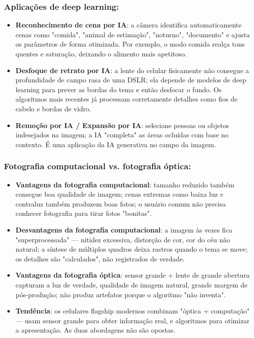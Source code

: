 \subsubsection*{Aplicações de deep learning:}

\begin{itemize}
  \item \textbf{Reconhecimento de cena por IA}: a câmera identifica automaticamente cenas como "comida", "animal de estimação", "noturno", "documento" e ajusta os parâmetros de forma otimizada. Por exemplo, o modo comida realça tons quentes e saturação, deixando o alimento mais apetitoso.
  \item \textbf{Desfoque de retrato por IA}: a lente do celular fisicamente não consegue a profundidade de campo rasa de uma DSLR; ela depende de modelos de deep learning para prever as bordas do tema e então desfocar o fundo. Os algoritmos mais recentes já processam corretamente detalhes como fios de cabelo e bordas de vidro.
  \item \textbf{Remoção por IA / Expansão por IA}: selecione pessoas ou objetos indesejados na imagem; a IA "completa" as áreas ocluídas com base no contexto. É uma aplicação da IA generativa no campo da imagem.
\end{itemize}

\subsubsection*{Fotografia computacional vs. fotografia óptica:}

\begin{itemize}
  \item \textbf{Vantagens da fotografia computacional}: tamanho reduzido também consegue boa qualidade de imagem; cenas extremas como baixa luz e contraluz também produzem boas fotos; o usuário comum não precisa conhecer fotografia para tirar fotos "bonitas".
  \item \textbf{Desvantagens da fotografia computacional}: a imagem às vezes fica "superprocessada" — nitidez excessiva, distorção de cor, cor do céu não natural; a síntese de múltiplos quadros deixa rastros quando o tema se move; os detalhes são "calculados", não registrados de verdade.
  \item \textbf{Vantagens da fotografia óptica}: sensor grande + lente de grande abertura capturam a luz de verdade, qualidade de imagem natural, grande margem de pós-produção; não produz artefatos porque o algoritmo "não inventa".
  \item \textbf{Tendência}: os celulares flagship modernos combinam "óptica + computação" — usam sensor grande para obter informação real, e algoritmos para otimizar a apresentação. As duas abordagens não são opostas.
\end{itemize}

